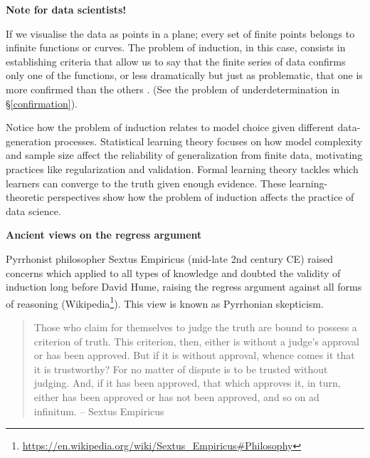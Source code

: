 \documentclass[
  12pt,
]{book}
\DeclareRobustCommand{\href}[2]{#2\footnote{\url{#1}}}
\begin{document}
\begin{tipbox}

\textbf{Note for data scientists!}

If we visualise the data as points in a plane; every set of finite points belongs to infinite functions or curves. The problem of induction, in this case, consists in establishing criteria that allow us to say that the finite series of data confirms only one of the functions, or less dramatically but just as problematic, that one is more confirmed than the others \citep{diez1997fundamentos}. (See the problem of underdetermination in §\ref{confirmation}).

Notice how the problem of induction relates to model choice given different data-generation processes. Statistical learning theory focuses on how model complexity and sample size affect the reliability of generalization from finite data, motivating practices like regularization and validation. Formal learning theory tackles which learners can converge to the truth given enough evidence. These learning-theoretic perspectives show how the problem of induction affects the practice of data science.

\end{tipbox}

\begin{simplebox}

\textbf{Ancient views on the regress argument}

Pyrrhonist philosopher Sextus Empiricus (mid-late 2nd century CE) raised concerns which applied to all types of knowledge and doubted the validity of induction long before David Hume, raising the regress argument against all forms of reasoning (\href{https://en.wikipedia.org/wiki/Sextus_Empiricus\#Philosophy}{Wikipedia}). This view is known as Pyrrhonian skepticism.

\begin{quote}
Those who claim for themselves to judge the truth are bound to possess a criterion of truth. This criterion, then, either is without a judge's approval or has been approved. But if it is without approval, whence comes it that it is trustworthy? For no matter of dispute is to be trusted without judging. And, if it has been approved, that which approves it, in turn, either has been approved or has not been approved, and so on ad infinitum. -- Sextus Empiricus
\end{quote}

\end{simplebox}
\end{document}
